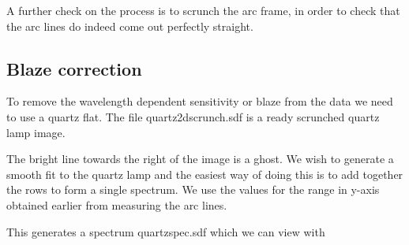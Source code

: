 \documentclass[twoside,11pt]{starlink}
\providecommand{\scspec}[2]{#1}
\begin{document}
A further check on the process is to scrunch the arc frame, in order
to check that the arc lines do indeed come out perfectly straight.


\subsection{Blaze correction}

To remove the wavelength dependent sensitivity or blaze from the data
we need to use a quartz flat. The file quartz2dscrunch.sdf is a ready
scrunched quartz lamp image.

{\scspec{\small}{ }
\begin{terminalv}
\end{terminalv}
}

The bright line towards the right of the image is a ghost. We wish to
generate a smooth fit to the quartz lamp and the easiest way of doing
this is to add together the rows to form a single spectrum. We use the
values for the range in y-axis obtained earlier from measuring the arc
lines.

{\scspec{\small}{ }
\begin{terminalv}
\end{terminalv}
}

This generates a spectrum quartzspec.sdf which we can view with

{\scspec{\small}{ }
\begin{terminalv}
\end{terminalv}
}
\end{document}
